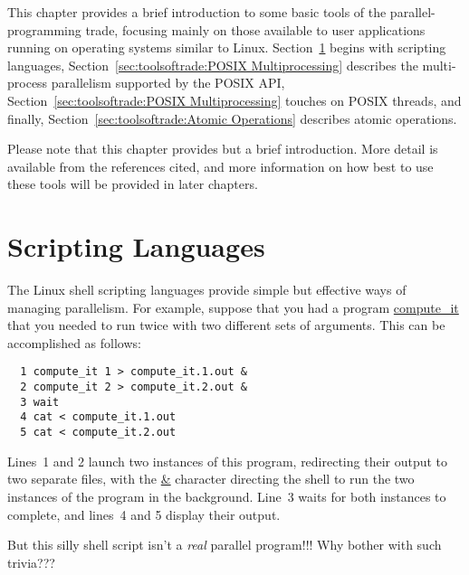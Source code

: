 

This chapter provides a brief introduction to some basic tools of the
parallel-programming trade, focusing mainly on those available to
user applications running on operating systems similar to Linux.
Section~\ref{sec:toolsoftrade:Scripting Languages} begins with
scripting languages,
Section~\ref{sec:toolsoftrade:POSIX Multiprocessing}
describes the multi-process parallelism supported by the POSIX API,
Section~\ref{sec:toolsoftrade:POSIX Multiprocessing} touches on POSIX threads,
and finally,
Section~\ref{sec:toolsoftrade:Atomic Operations}
describes atomic operations.

Please note that this chapter provides but a brief introduction.
More detail is available from the references cited, and more information
on how best to use these tools will be provided in later chapters.

\section{Scripting Languages}
\label{sec:toolsoftrade:Scripting Languages}

The Linux shell scripting languages provide simple but effective ways
of managing parallelism.
For example, suppose that you had a program \url{compute_it}
that you needed to run twice with two different sets of arguments.
This can be accomplished as follows:

\vspace{5pt}
\begin{minipage}[t]{\columnwidth}
\begin{verbatim}
  1 compute_it 1 > compute_it.1.out &
  2 compute_it 2 > compute_it.2.out &
  3 wait
  4 cat < compute_it.1.out
  5 cat < compute_it.2.out
\end{verbatim}
\end{minipage}
\vspace{5pt}

Lines~1 and 2 launch two instances of this program, redirecting their
output to two separate files, with the \url{&} character directing the
shell to run the two instances of the program in the background.
Line~3 waits for both instances to complete, and lines~4 and 5
display their output.

\QuickQuiz{}
	But this silly shell script isn't a \emph{real} parallel program!!!
	Why bother with such trivia???
 \QuickQuizEnd

